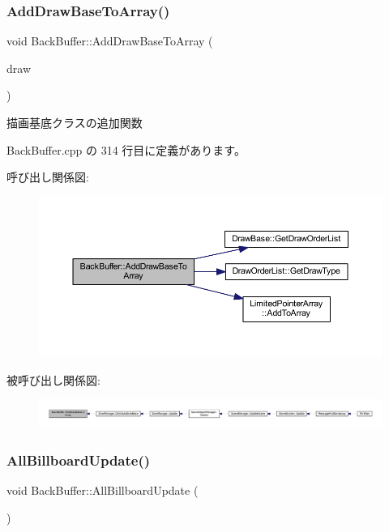 \subsubsection{\texorpdfstring{Add\+Draw\+Base\+To\+Array()}{AddDrawBaseToArray()}}
{\footnotesize\ttfamily void Back\+Buffer\+::\+Add\+Draw\+Base\+To\+Array (\begin{DoxyParamCaption}\item[{\mbox{\hyperlink{class_draw_base}{Draw\+Base}} $\ast$}]{draw }\end{DoxyParamCaption})}



描画基底クラスの追加関数 



 Back\+Buffer.\+cpp の 314 行目に定義があります。

呼び出し関係図\+:\nopagebreak
\begin{figure}[H]
\begin{center}
\leavevmode
\includegraphics[width=350pt]{class_back_buffer_ab9cae17a69086b467f6e016e432b224b_cgraph}
\end{center}
\end{figure}
被呼び出し関係図\+:
\nopagebreak
\begin{figure}[H]
\begin{center}
\leavevmode
\includegraphics[width=350pt]{class_back_buffer_ab9cae17a69086b467f6e016e432b224b_icgraph}
\end{center}
\end{figure}
\mbox{\label{class_back_buffer_a1b93b223c80549e7b11e1d91b56552bc}} 
\subsubsection{\texorpdfstring{All\+Billboard\+Update()}{AllBillboardUpdate()}}
{\footnotesize\ttfamily void Back\+Buffer\+::\+All\+Billboard\+Update (\begin{DoxyParamCaption}{ }\end{DoxyParamCaption})\hspace{0.3cm}{\ttfamily [private]}}



